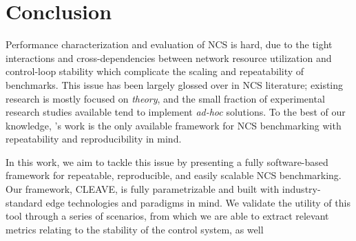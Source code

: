 \section{Conclusion}\label{sec:conclusion}

Performance characterization and evaluation of \acl{NCS} is hard, due to the tight interactions and cross-dependencies between network resource utilization and control-loop stability which complicate the scaling and repeatability of benchmarks.
This issue has been largely glossed over in \ac{NCS} literature; existing research is mostly focused on \emph{theory}, and the small fraction of experimental research studies available tend to implement \emph{ad-hoc} solutions.
To the best of our knowledge, \textcite{Zoppi2020NCSBench}'s work is the only available framework for \ac{NCS} benchmarking with repeatability and reproducibility in mind.

In this work, we aim to tackle this issue by presenting a fully software-based framework for repeatable, reproducible, and easily scalable \ac{NCS} benchmarking.
Our framework, \ac{CLEAVE}, is fully parametrizable and built with industry-standard edge technologies and paradigms in mind.
We validate the utility of this tool through a series of scenarios, from which we are able to extract relevant metrics relating to the stability of the control system, as well 





